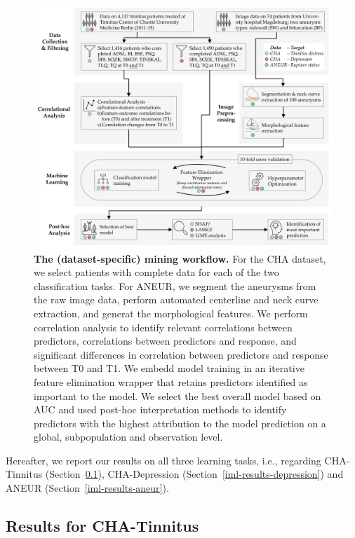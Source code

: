 \documentclass[
  oneside]{book}
\begin{document}
\begin{figure}[htb]

{\centering \includegraphics[width=1\linewidth]{figures/08-iml-workflow} 

}

\caption{\textbf{The (dataset-specific) mining workflow.} For the CHA dataset, we select patients with complete data for each of the two classification tasks. For ANEUR, we segment the aneurysms from the raw image data, perform automated centerline and neck curve extraction, and generat the morphological features. We perform correlation analysis to identify relevant correlations between predictors, correlations between predictors and response, and significant differences in correlation between predictors and response between T0 and T1. We embedd model training in an iterative feature elimination wrapper that retains predictors identified as important to the model. We select the best overall model based on AUC and used post-hoc interpretation methods to identify predictors with the highest attribution to the model prediction on a global, subpopulation and observation level.}\label{fig:08-iml-workflow}
\end{figure}

Hereafter, we report our results on all three learning tasks, i.e., regarding CHA-Tinnitus (Section~\ref{iml-results-tinnitus}),
CHA-Depression (Section~\ref{iml-results-depression}) and
ANEUR (Section~\ref{iml-results-aneur}).

\hypertarget{iml-results-tinnitus}{%
\subsection{Results for CHA-Tinnitus}\label{iml-results-tinnitus}}
\end{document}
